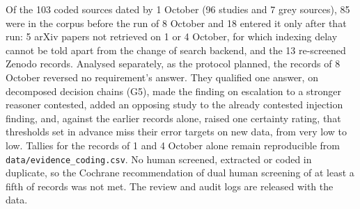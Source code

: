 Of the 103 coded sources dated by 1 October (96 studies and 7 grey sources), 85 were in the corpus before the run of 8 October and 18 entered it only after that run: 5 arXiv papers not retrieved on 1 or 4 October, for which indexing delay cannot be told apart from the change of search backend, and the 13 re-screened Zenodo records. Analysed separately, as the protocol planned, the records of 8 October reversed no requirement's answer. They qualified one answer, on decomposed decision chains (G5), made the finding on escalation to a stronger reasoner contested, added an opposing study to the already contested injection finding, and, against the earlier records alone, raised one certainty rating, that thresholds set in advance miss their error targets on new data, from very low to low. Tallies for the records of 1 and 4 October alone remain reproducible from \nolinkurl{data/evidence_coding.csv}. No human screened, extracted or coded in duplicate, so the Cochrane recommendation of dual human screening of at least a fifth of records \cite{garritty2021cochrane} was not met. The review and audit logs are released with the data.
